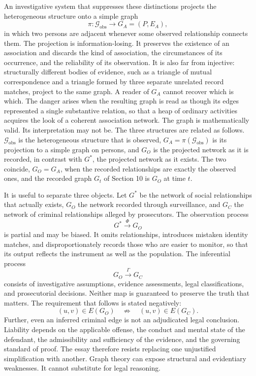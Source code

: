 \documentclass[11pt]{article}
\theoremstyle{definition}
\theoremstyle{remark}
\begin{document}
An investigative system that suppresses these distinctions projects the heterogeneous structure onto a simple graph
\[
\pi : \mathcal{G}_{\mathrm{obs}} \longrightarrow G_A = (P, E_A),
\]
in which two persons are adjacent whenever some observed relationship connects them. The projection is information-losing. It preserves the existence of an association and discards the kind of association, the circumstances of its occurrence, and the reliability of its observation. It is also far from injective: structurally different bodies of evidence, such as a triangle of mutual correspondence and a triangle formed by three separate unrelated record matches, project to the same graph. A reader of $G_A$ cannot recover which is which. The danger arises when the resulting graph is read as though its edges represented a single substantive relation, so that a heap of ordinary activities acquires the look of a coherent association network. The graph is mathematically valid. Its interpretation may not be. The three structures are related as follows. $\mathcal{G}_{\mathrm{obs}}$ is the heterogeneous structure that is observed, $G_A = \pi(\mathcal{G}_{\mathrm{obs}})$ is its projection to a simple graph on persons, and $G_O$ is the projected network as it is recorded, in contrast with $G^{\ast}$, the projected network as it exists. The two coincide, $G_O = G_A$, when the recorded relationships are exactly the observed ones, and the recorded graph $G_t$ of Section 10 is $G_O$ at time $t$.

It is useful to separate three objects. Let $G^{\ast}$ be the network of social relationships that actually exists, $G_O$ the network recorded through surveillance, and $G_C$ the network of criminal relationships alleged by prosecutors. The observation process
\[
G^{\ast} \xrightarrow{\ \Phi\ } G_O
\]
is partial and may be biased. It omits relationships, introduces mistaken identity matches, and disproportionately records those who are easier to monitor, so that its output reflects the instrument as well as the population. The inferential process
\[
G_O \xrightarrow{\ \Gamma\ } G_C
\]
consists of investigative assumptions, evidence assessments, legal classifications, and prosecutorial decisions. Neither map is guaranteed to preserve the truth that matters. The requirement that follows is stated negatively:
\[
(u,v) \in E(G_O) \quad\not\Rightarrow\quad (u,v) \in E(G_C).
\]
Further, even an inferred criminal edge is not an adjudicated legal conclusion. Liability depends on the applicable offense, the conduct and mental state of the defendant, the admissibility and sufficiency of the evidence, and the governing standard of proof. The essay therefore resists replacing one unjustified simplification with another. Graph theory can expose structural and evidentiary weaknesses. It cannot substitute for legal reasoning.
\end{document}
